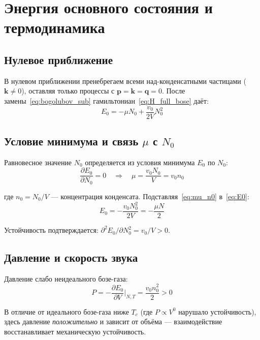 \documentclass[../general/general]{subfiles}
\begin{document}
\section{Энергия основного состояния и термодинамика}

\subsection{Нулевое приближение}

В нулевом приближении пренебрегаем всеми над-конденсатными частицами ($\mathbf{k} \neq 0$), оставляя только процессы с $\mathbf{p} = \mathbf{k} = \mathbf{q} = 0$. После замены~\eqref{eq:bogolubov_sub} гамильтониан~\eqref{eq:H_full_bose} даёт:
\begin{equation}
    E_0 = -\mu N_0 + \frac{v_0}{2V}N_0^2
    \label{eq:E0}
\end{equation}

\subsection{Условие минимума и связь $\mu$ с $N_0$}

Равновесное значение $N_0$ определяется из условия минимума $E_0$ по $N_0$:
\begin{equation}
    \frac{\partial E_0}{\partial N_0} = 0 \quad \Rightarrow \quad \mu = \frac{v_0 N_0}{V} = v_0 n_0
    \label{eq:mu_n0}
\end{equation}

где $n_0 = N_0/V$ --- концентрация конденсата. Подставляя~\eqref{eq:mu_n0} в~\eqref{eq:E0}:
\begin{equation}
    E_0 = -\frac{v_0 N_0^2}{2V} = -\frac{\mu N}{2}
    \label{eq:E0_final}
\end{equation}

Устойчивость подтверждается: $\partial^2 E_0/\partial N_0^2 = v_0/V > 0$.

\subsection{Давление и скорость звука}

Давление слабо неидеального бозе-газа:
\begin{equation}
    P = -\frac{\partial E_0}{\partial V}\bigg|_{N,T} = \frac{v_0 n_0^2}{2} > 0
    \label{eq:pressure}
\end{equation}

В отличие от идеального бозе-газа ниже $T_c$ (где $P \propto V^0$ нарушало устойчивость), здесь давление \emph{положительно} и зависит от объёма --- взаимодействие восстанавливает механическую устойчивость.
\end{document}
